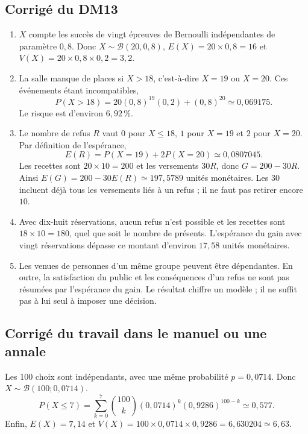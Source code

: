 \subsection{Corrigé du DM13}\begin{enumerate}
\item $X$ compte les succès de vingt épreuves de Bernoulli indépendantes de paramètre $0{,}8$. Donc $X\sim\mathcal B(20,0{,}8)$, $E(X)=20\times0{,}8=16$ et $V(X)=20\times0{,}8\times0{,}2=3{,}2$.
\item La salle manque de places si $X>18$, c'est-à-dire $X=19$ ou $X=20$. Ces événements étant incompatibles,
\[P(X>18)=20(0{,}8)^{19}(0{,}2)+(0{,}8)^{20}\simeq0{,}069175.\]
Le risque est d'environ $6{,}92\,\%$.
\item Le nombre de refus $R$ vaut $0$ pour $X\le18$, $1$ pour $X=19$ et $2$ pour $X=20$. Par définition de l'espérance,
\[E(R)=P(X=19)+2P(X=20)\simeq0{,}0807045.\]
Les recettes sont $20\times10=200$ et les versements $30R$, donc $G=200-30R$. Ainsi $E(G)=200-30E(R)\simeq197{,}5789$ unités monétaires. Les $30$ incluent déjà tous les versements liés à un refus ; il ne faut pas retirer encore $10$.
\item Avec dix-huit réservations, aucun refus n'est possible et les recettes sont $18\times10=180$, quel que soit le nombre de présents. L'espérance du gain avec vingt réservations dépasse ce montant d'environ $17{,}58$ unités monétaires.
\item Les venues de personnes d'un même groupe peuvent être dépendantes. En outre, la satisfaction du public et les conséquences d'un refus ne sont pas résumées par l'espérance du gain. Le résultat chiffre un modèle ; il ne suffit pas à lui seul à imposer une décision.
\end{enumerate}

\subsection{Corrigé du travail dans le manuel ou une annale}Les $100$ choix sont indépendants, avec une même probabilité $p=0{,}0714$. Donc $X\sim\mathcal B(100;0{,}0714)$.
\[P(X\le7)=\sum_{k=0}^7\binom{100}k(0{,}0714)^k(0{,}9286)^{100-k}\simeq0{,}577.\]
Enfin, $E(X)=7{,}14$ et $V(X)=100\times0{,}0714\times0{,}9286=6{,}630204\simeq6{,}63$.

\fi

